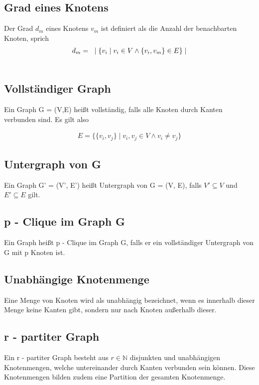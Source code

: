 \documentclass[12pt, a4paper]{article}
\begin{document}
\subsection{Grad eines Knotens}
\label{theorem:grad-eines-knotens}
Der Grad $d_m$ eines Knotens $v_m$ ist definiert als die Anzahl der benachbarten Knoten, sprich
\begin{gather}
\begin{split}d_m = \text{  } \mid \{ v_i \mid v_i \in V \wedge \{ v_i, v_m \} \in E \} \mid\end{split}\notag\\\begin{split}\end{split}\notag
\end{gather}

\subsection{Vollständiger Graph}
Ein Graph G = (V,E) heißt vollständig, falls alle Knoten durch Kanten verbunden sind. Es gilt also 

\begin{align*}
	E  = \{ \{ v_i , v_j \} \mid v_i, v_j \in V  \wedge v_i \neq v_j \}
\end{align*}

\subsection{Untergraph von G}
Ein Graph G' = (V', E') heißt Untergraph von G = (V, E), falls $V' \subseteq V$ und $E' \subseteq E$ gilt. 

\subsection{p - Clique im Graph G}
\label{theorem:p-clique-im-graph-g}
Ein Graph heißt p - Clique im Graph G, falls er ein vollständiger Untergraph von G mit p Knoten ist.


\subsection{Unabhängige Knotenmenge}
\label{theorem:unabhangige-knotenmenge}
Eine Menge von Knoten wird als unabhängig bezeichnet, wenn es innerhalb dieser Menge keine Kanten gibt, sondern nur nach Knoten außerhalb dieser.


\subsection{r - partiter Graph}
\label{theorem:r-partiter-graph}
Ein r - partiter Graph besteht aus $r \in \mathbb{N}$  disjunkten und unabhängigen Knotenmengen, welche untereinander durch Kanten verbunden sein können. Diese Knotenmengen bilden zudem eine Partition der gesamten Knotenmenge.
\end{document}
